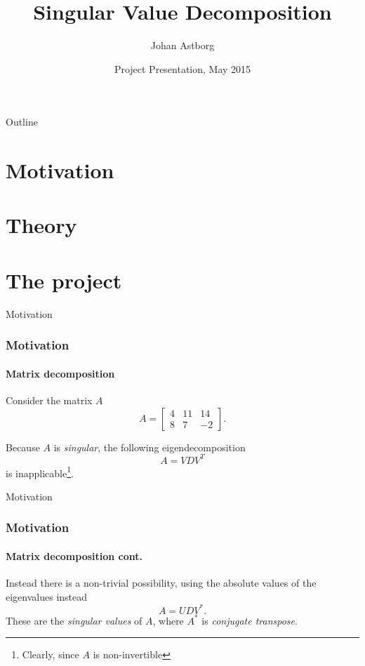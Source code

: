 \documentclass{beamer}
\title{Singular Value Decomposition}
\author{Johan Astborg}
\institute[Lund University]{Computational Programming with Python}
\date{Project Presentation, May 2015}
\begin{document}
\begin{frame}
  \titlepage
\end{frame}

\begin{frame}{Outline}
  \tableofcontents
\end{frame}

\section{Motivation}
\section{Theory}
\section{The project}


\begin{frame}{Motivation}

\frametitle{Motivation}
\framesubtitle{Matrix decomposition}

Consider the matrix $A$
\begin{equation}
A = \begin{bmatrix}4 & 11 & 14 \\8 & 7 & -2 \end{bmatrix}.
\end{equation}

Because $A$ is \emph{singular}, the following eigendecomposition
\begin{equation}
A=VDV^T
\end{equation}
is inapplicable\footnote{Clearly, since $A$ is non-invertible}.

\end{frame}


\begin{frame}{Motivation}

\frametitle{Motivation}
\framesubtitle{Matrix decomposition cont.}

Instead there is a non-trivial possibility, using the absolute values of the eigenvalues instead
\begin{equation}
A=UDV^* .
\end{equation}
These are the \emph{singular values} of $A$, where $A^*$ is \emph{conjugate transpose}.

\end{frame}
\end{document}
